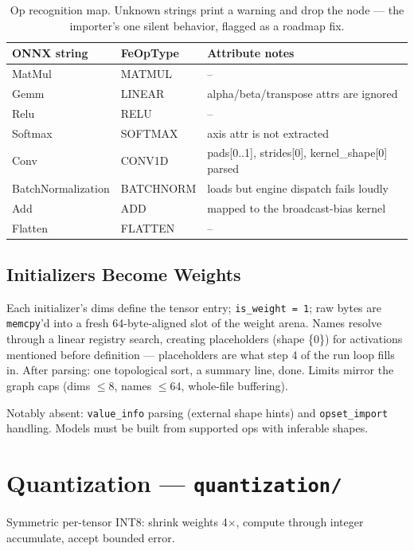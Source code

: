 \documentclass[11pt,a4paper]{article}
\begin{document}
\begin{table}[h]
\centering
\begin{tabular}{@{}lll@{}}
\toprule
\textbf{ONNX string} & \textbf{FeOpType} & \textbf{Attribute notes} \\
\midrule
MatMul & MATMUL & --\\
Gemm & LINEAR & alpha/beta/transpose attrs are ignored\\
Relu & RELU & --\\
Softmax & SOFTMAX & axis attr is not extracted\\
Conv & CONV1D & pads[0..1], strides[0], kernel\_shape[0] parsed\\
BatchNormalization & BATCHNORM & loads but engine dispatch fails loudly\\
Add & ADD & mapped to the broadcast-bias kernel\\
Flatten & FLATTEN & --\\
\bottomrule
\end{tabular}
\caption{Op recognition map. Unknown strings print a warning and drop the node
--- the importer's one silent behavior, flagged as a roadmap fix.}
\end{table}

\subsection{Initializers Become Weights}

Each initializer's dims define the tensor entry; \texttt{is\_weight = 1}; raw
bytes are \texttt{memcpy}'d into a fresh 64-byte-aligned slot of the weight
arena. Names resolve through a linear registry search, creating placeholders
(shape \{0\}) for activations mentioned before definition --- placeholders are
what step 4 of the run loop fills in. After parsing: one topological sort, a
summary line, done. Limits mirror the graph caps (dims $\le 8$, names $\le 64$,
whole-file buffering).

Notably absent: \texttt{value\_info} parsing (external shape hints) and
\texttt{opset\_import} handling. Models must be built from supported ops with
inferable shapes.

\section{Quantization --- \texttt{quantization/}}

Symmetric per-tensor INT8: shrink weights 4$\times$, compute through integer
accumulate, accept bounded error.
\end{document}
